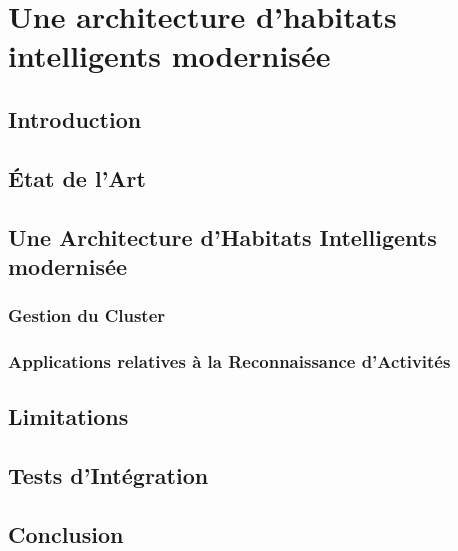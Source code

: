 \chapter{Une architecture d'habitats intelligents modernisée}
\label{chap:6}

\section{Introduction}

\section{État de l'Art}

\section{Une Architecture d'Habitats Intelligents modernisée}

\subsection{Gestion du Cluster}

\subsection{Applications relatives à la Reconnaissance d'Activités}

\section{Limitations}

\section{Tests d'Intégration}

\section{Conclusion}